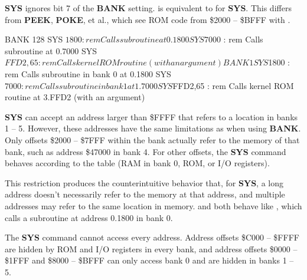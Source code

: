 {\bf SYS} ignores bit 7 of the {\bf BANK} setting.  is
equivalent to  for {\bf SYS}. This differs from {\bf PEEK},
{\bf POKE}, et al., which see ROM code from \$2000 -- \$BFFF with
.

\begin{screenoutput}
BANK 128
SYS $1800        : rem Calls subroutine at 0.1800
SYS $7000        : rem Calls subroutine at 0.7000
SYS $FFD2,65     : rem Calls kernel ROM routine (with an argument)

BANK 1
SYS $1800        : rem Calls subroutine in bank 0 at 0.1800
SYS $7000        : rem Calls subroutine in bank 1 at 1.7000
SYS $FFD2,65     : rem Calls kernel ROM routine at 3.FFD2 (with an argument)
\end{screenoutput}

{\bf SYS} can accept an address larger than \$FFFF that refers to a location
in banks 1 -- 5. However, these addresses have the same limitations as when
using {\bf BANK}. Only offsets \$2000 -- \$7FFF within the bank actually refer
to the memory of that bank, such as address \$47000 in bank 4. For other
offsets, the {\bf SYS} command behaves according to the table (RAM in bank 0,
ROM, or I/O registers).

This restriction produces the counterintuitive behavior that, for {\bf SYS}, a
long address doesn't necessarily refer to the memory at that address, and
multiple addresses may refer to the same location in memory. 
and  both behave like , which calls a
subroutine at address 0.1800 in bank 0.


The {\bf SYS} command cannot access every address. Address offsets \$C000 --
\$FFFF are hidden by ROM and I/O registers in every bank, and address offsets
\$0000 -- \$1FFF and \$8000 -- \$BFFF can only access bank 0 and are hidden in
banks 1 -- 5.

